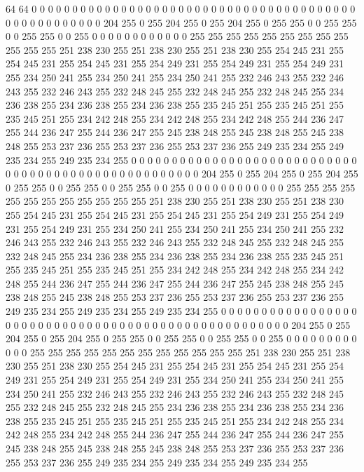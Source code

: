 64 64 0 0 0 0 0 0 0 0 0 0 0 0 0 0 0 0 0 0 0 0 0 0 0 0 0 0 0 0 0 0 0 0 0 0 0 0 0 0 0 0 0 0 0 0 0 0 0 0 0 0 0 0 204 255 0 255 204 255 0 255 204 255 0 255
255 0 0 255 255 0 0 255 255 0 0 255 0 0 0 0 0 0 0 0 0 0 0 0 255 255 255 255 255 255 255 255 255 255 255 255 251 238 230 255 251 238 230 255 251 238 230 255 254 245 231 255 254 245 231 255 254 245 231 255 254 249 231 255
254 249 231 255 254 249 231 255 234 250 241 255 234 250 241 255 234 250 241 255 232 246 243 255 232 246 243 255 232 246 243 255 232 248 245 255 232 248 245 255 232 248 245 255 234 236 238 255 234 236 238 255 234 236 238 255 235 245 251 255 235 245 251 255
235 245 251 255 234 242 248 255 234 242 248 255 234 242 248 255 244 236 247 255 244 236 247 255 244 236 247 255 245 238 248 255 245 238 248 255 245 238 248 255 253 237 236 255 253 237 236 255 253 237 236 255 249 235 234 255 249 235 234 255 249 235 234 255
0 0 0 0 0 0 0 0 0 0 0 0 0 0 0 0 0 0 0 0 0 0 0 0 0 0 0 0 0 0 0 0 0 0 0 0 0 0 0 0 0 0 0 0 0 0 0 0 0 0 0 0 204 255 0 255 204 255 0 255 204 255 0 255
255 0 0 255 255 0 0 255 255 0 0 255 0 0 0 0 0 0 0 0 0 0 0 0 255 255 255 255 255 255 255 255 255 255 255 255 251 238 230 255 251 238 230 255 251 238 230 255 254 245 231 255 254 245 231 255 254 245 231 255 254 249 231 255
254 249 231 255 254 249 231 255 234 250 241 255 234 250 241 255 234 250 241 255 232 246 243 255 232 246 243 255 232 246 243 255 232 248 245 255 232 248 245 255 232 248 245 255 234 236 238 255 234 236 238 255 234 236 238 255 235 245 251 255 235 245 251 255
235 245 251 255 234 242 248 255 234 242 248 255 234 242 248 255 244 236 247 255 244 236 247 255 244 236 247 255 245 238 248 255 245 238 248 255 245 238 248 255 253 237 236 255 253 237 236 255 253 237 236 255 249 235 234 255 249 235 234 255 249 235 234 255
0 0 0 0 0 0 0 0 0 0 0 0 0 0 0 0 0 0 0 0 0 0 0 0 0 0 0 0 0 0 0 0 0 0 0 0 0 0 0 0 0 0 0 0 0 0 0 0 0 0 0 0 204 255 0 255 204 255 0 255 204 255 0 255
255 0 0 255 255 0 0 255 255 0 0 255 0 0 0 0 0 0 0 0 0 0 0 0 255 255 255 255 255 255 255 255 255 255 255 255 251 238 230 255 251 238 230 255 251 238 230 255 254 245 231 255 254 245 231 255 254 245 231 255 254 249 231 255
254 249 231 255 254 249 231 255 234 250 241 255 234 250 241 255 234 250 241 255 232 246 243 255 232 246 243 255 232 246 243 255 232 248 245 255 232 248 245 255 232 248 245 255 234 236 238 255 234 236 238 255 234 236 238 255 235 245 251 255 235 245 251 255
235 245 251 255 234 242 248 255 234 242 248 255 234 242 248 255 244 236 247 255 244 236 247 255 244 236 247 255 245 238 248 255 245 238 248 255 245 238 248 255 253 237 236 255 253 237 236 255 253 237 236 255 249 235 234 255 249 235 234 255 249 235 234 255
